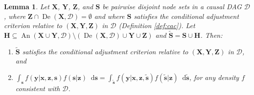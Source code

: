 \documentclass[twoside]{article}
\newtheorem{lemma}[theorem]{Lemma}
\DeclareMathOperator{\An}{An}
\DeclareMathOperator{\De}{De}
\newcommand{\mb}[1]{\mathbf{#1}}
\newcommand{\g}[1][G]{\mathcal{#1}}
\newcommand*\diff{\mathop{}\!\mathrm{d}}
\begin{document}

\begin{lemma}
\label{lem:sound-setup1}
    Let $\mb{X}$, $\mb{Y}$, $\mb{Z}$, and $\mb{S}$ be pairwise disjoint node sets in a causal DAG $\g[D]$, where $\mb{Z} \cap \De(\mb{X}, \g[D]) = \emptyset$ and where $\mb{S}$ satisfies the conditional adjustment criterion relative to $(\mb{X,Y,Z})$ in $\g[D]$ (Definition \ref{def:cac}). Let $\mb{H} \subseteq \An(\mb{X} \cup \mb{Y},\g[D]) \setminus (\De(\mb{X}, \g[D]) \cup \mb{Y} \cup \mb{Z})$ and $\mb{\tilde{S}} = \mb{S} \cup \mb{H}$. Then:
    \begin{enumerate}[label = (\roman*)]
        \item \label{lem:sound-setup1-a} $\mb{\tilde{S}}$ satisfies the conditional adjustment criterion relative to $(\mb{X,Y,Z})$ in $\g[D]$, and
        \item \label{lem:sound-setup1-b} $\int_\mb{s} f(\mb{y} | \mb{x,z,s})f(\mb{s} | \mb{z}) \diff \mb{s} = \int_{\mb{\tilde{s}}} f(\mb{y} | \mb{x,z,\tilde{s}}) f(\mb{\tilde{s}} | \mb{z})  \diff \mb{\tilde{s}}$, for any density $f$ consistent with $\g[D]$.
    \end{enumerate}
\end{lemma}
\end{document}
